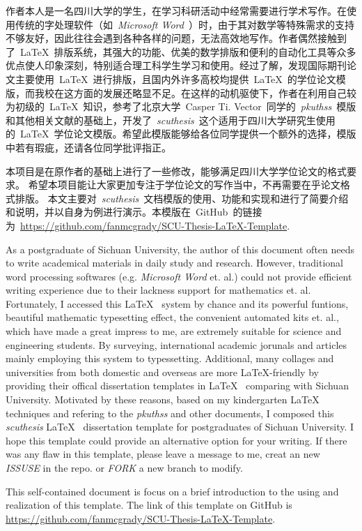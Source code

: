 \begin{CHSabstract}
	作者本人是一名四川大学的学生，在学习科研活动中经常需要进行学术写作。在使用传统的字处理软件（如~\emph{Microsoft\textsuperscript{\textregistered} Word}~）时，由于其对数学等特殊需求的支持不够友好，因此往往会遇到各种各样的问题，无法高效地写作。作者偶然接触到了~\LaTeX~排版系统，其强大的功能、优美的数学排版和便利的自动化工具等众多优点使人印象深刻，特别适合理工科学生学习和使用。经过了解，发现国际期刊论文主要使用~\LaTeX~进行排版，且国内外许多高校均提供~\LaTeX~的学位论文模版，而我校在这方面的发展还略显不足。在这样的动机驱使下，作者在利用自己较为初级的~\LaTeX~知识，参考了北京大学~Casper Ti. Vector~同学的~\emph{pkuthss}~模版和其他相关文献的基础上，开发了~\emph{scuthesis}~这个适用于四川大学研究生使用的~\LaTeX~学位论文模版。希望此模版能够给各位同学提供一个额外的选择，模版中若有瑕疵，还请各位同学批评指正。
	
	本项目是在原作者的基础上进行了一些修改，能够满足四川大学学位论文的格式要求。 希望本项目能让大家更加专注于学位论文的写作当中，不再需要在乎论文格式排版。
	本文主要对~\emph{scuthesis}~文档模版的使用、功能和实现和进行了简要介绍和说明，并以自身为例进行演示。本模版在~GitHub~的链接为~\url{https://github.com/fanmcgrady/SCU-Thesis-LaTeX-Template}.
\end{CHSabstract}

\begin{ENGabstract}
	As a postgraduate of Sichuan University, the author of this document often needs to write academical materials in daily study and research. However, traditional word processing softwares (e.g. \emph{Microsoft\textsuperscript{\textregistered} Word} et. al.) could not provide efficient writing experience due to their lackness support for mathematics et. al. Fortunately, I accessed this \LaTeX~ system by chance and its powerful funtions, beautiful mathematic typesetting effect, the convenient automated kits et. al., which have made a great impress to me, are extremely suitable for science and engineering students. By surveying, international academic jorunals and articles mainly employing this system to typessetting. Additional, many collages and universities from both domestic and overseas are more \LaTeX-friendly by providing their offical dissertation templates in \LaTeX~ comparing with Sichuan University. Motivated by these reasons, based on my kindergarten \LaTeX~ techniques and refering to the \emph{pkuthss} and other documents, I composed this \emph{scuthesis} \LaTeX~ dissertation template for postgraduates of Sichuan University. I hope this template could provide an alternative option for your writing. If there was any flaw in this template, please leave a message to me, creat an new \emph{ISSUSE} in the repo. or \emph{FORK} a new branch to modify.


	This self-contained document is focus on a brief introduction to the using and realization of this template. The link of this template on GitHub is \url{https://github.com/fanmcgrady/SCU-Thesis-LaTeX-Template}.
\end{ENGabstract}
